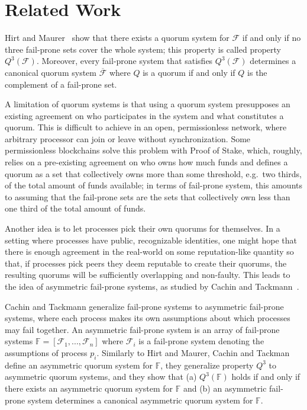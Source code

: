 \documentclass[11pt,letterpaper]{article}
\begin{document}
\section{Related Work}

Hirt and Maurer~\cite{hirtPlayerSimulationGeneral2000} show that there exists a quorum system for $\mathcal{F}$ if and only if no three fail-prone sets cover the whole system; this property is called property $Q^3(\mathcal{F})$. Moreover, every fail-prone system that satisfies $Q^3(\mathcal{F})$ determines a canonical quorum system $\overline{\mathcal{F}}$ where $Q$ is a quorum if and only if $Q$ is the complement of a fail-prone set. %

A limitation of quorum systems is that using a quorum system presupposes an existing agreement on who participates in the system and what constitutes a quorum.
This is difficult to achieve in an open, permissionless network, where arbitrary processor can join or leave without synchronization.
Some permissionless blockchains solve this problem with Proof of Stake, which, roughly, relies on a pre-existing agreement on who owns how much funds and defines a quorum as a set that collectively owns more than some threshold, e.g.\ two thirds, of the total amount of funds available; in terms of fail-prone system, this amounts to assuming that the fail-prone sets are the sets that collectively own less than one third of the total amount of funds.

Another idea is to let processes pick their own quorums for themselves. In a setting where processes have public, recognizable identities, one might hope that there is enough agreement in the real-world on some reputation-like quantity so that, if processes pick peers they deem reputable to create their quorums, the resulting quorums will be sufficiently overlapping and non-faulty. This leads to the idea of asymmetric fail-prone systems, as studied by Cachin and Tackmann~\cite{cachinAsymmetricDistributedTrust2019}.

Cachin and Tackmann generalize fail-prone systems to asymmetric fail-prone systems, where each process makes its own assumptions about which processes may fail together.
An asymmetric fail-prone system is an array of fail-prone systems $\mathbb{F}=\left[\mathcal{F}_1,...,\mathcal{F}_n\right]$ where $\mathcal{F}_i$ is a fail-prone system denoting the assumptions of process $p_i$.  Similarly to Hirt and Maurer, Cachin and Tackman define an asymmetric quorum system for $\mathbb{F}$, they generalize property $Q^3$ to asymmetric quorum systems, and they show that (a) $Q^3(\mathbb{F})$ holds if and only if there exists an asymmetric quorum system for $\mathbb{F}$ and (b) an asymmetric fail-prone system determines a canonical asymmetric quorum system for $\mathbb{F}$.
\end{document}
